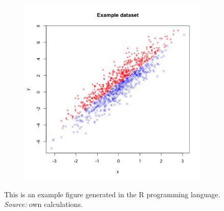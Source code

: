 \documentclass[english, twoside, 12pt, a4paper]{article}
\theoremstyle{definition}
\theoremstyle{plain}
\theoremstyle{remark}
\begin{document}
\begin{figure}[hbt]
  \centering

  \begin{subfigure}[t]{0.45\textwidth}
    \includegraphics[width=\textwidth]{./figs/fig_00.png}
  \end{subfigure}

  \captionsetup{margin=10pt,font=small,labelfont=bf,width=.8\textwidth}

  \caption[Short name]{This is an example figure generated in the R programming language.  \textit{Source:} own calculations.}\label{fig:xxx1}
\end{figure}
\end{document}
